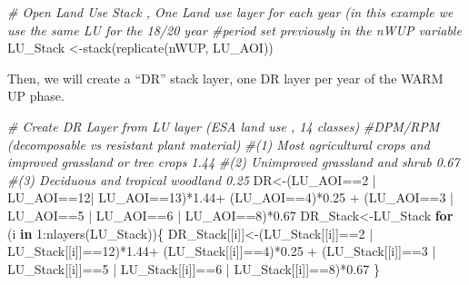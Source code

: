 \documentclass[
  10pt,
  b5paper,
]{book}
\newenvironment{Shaded}{\begin{snugshade}}{\end{snugshade}}
\newcommand{\CommentTok}[1]{\textcolor[rgb]{0.56,0.35,0.01}{\textit{#1}}}
\newcommand{\ControlFlowTok}[1]{\textcolor[rgb]{0.13,0.29,0.53}{\textbf{#1}}}
\newcommand{\DecValTok}[1]{\textcolor[rgb]{0.00,0.00,0.81}{#1}}
\newcommand{\FloatTok}[1]{\textcolor[rgb]{0.00,0.00,0.81}{#1}}
\newcommand{\FunctionTok}[1]{\textcolor[rgb]{0.00,0.00,0.00}{#1}}
\newcommand{\NormalTok}[1]{#1}
\newcommand{\OtherTok}[1]{\textcolor[rgb]{0.56,0.35,0.01}{#1}}
\newcommand{\SpecialCharTok}[1]{\textcolor[rgb]{0.00,0.00,0.00}{#1}}
\begin{document}
\begin{Shaded}
\begin{Highlighting}[]
\CommentTok{\# Open Land Use Stack , One Land use layer for each year (in this example we use the same LU for the 18/20 year \#period set previously in the nWUP variable}
\NormalTok{ LU\_Stack }\OtherTok{\textless{}{-}}\FunctionTok{stack}\NormalTok{(}\FunctionTok{replicate}\NormalTok{(nWUP, LU\_AOI))}
\end{Highlighting}
\end{Shaded}

Then, we will create a ``DR'' stack layer, one DR layer per year of the WARM UP phase.

\begin{Shaded}
\begin{Highlighting}[]
\CommentTok{\# Create DR Layer from LU layer (ESA land use , 14 classes)}
\CommentTok{\#DPM/RPM (decomposable vs resistant plant material)}
\CommentTok{\#(1) Most agricultural crops and improved grassland or tree crops 1.44 }
\CommentTok{\#(2) Unimproved grassland and shrub 0.67}
\CommentTok{\#(3) Deciduous and tropical woodland 0.25    }
\NormalTok{DR}\OtherTok{\textless{}{-}}\NormalTok{(LU\_AOI}\SpecialCharTok{==}\DecValTok{2} \SpecialCharTok{|}\NormalTok{ LU\_AOI}\SpecialCharTok{==}\DecValTok{12}\SpecialCharTok{|}\NormalTok{ LU\_AOI}\SpecialCharTok{==}\DecValTok{13}\NormalTok{)}\SpecialCharTok{*}\FloatTok{1.44}\SpecialCharTok{+}\NormalTok{ (LU\_AOI}\SpecialCharTok{==}\DecValTok{4}\NormalTok{)}\SpecialCharTok{*}\FloatTok{0.25} \SpecialCharTok{+}\NormalTok{ (LU\_AOI}\SpecialCharTok{==}\DecValTok{3} \SpecialCharTok{|}\NormalTok{ LU\_AOI}\SpecialCharTok{==}\DecValTok{5} \SpecialCharTok{|}\NormalTok{ LU\_AOI}\SpecialCharTok{==}\DecValTok{6} \SpecialCharTok{|}\NormalTok{ LU\_AOI}\SpecialCharTok{==}\DecValTok{8}\NormalTok{)}\SpecialCharTok{*}\FloatTok{0.67}
\NormalTok{DR\_Stack}\OtherTok{\textless{}{-}}\NormalTok{LU\_Stack}
\ControlFlowTok{for}\NormalTok{ (i }\ControlFlowTok{in} \DecValTok{1}\SpecialCharTok{:}\FunctionTok{nlayers}\NormalTok{(LU\_Stack))\{}
\NormalTok{DR\_Stack[[i]]}\OtherTok{\textless{}{-}}\NormalTok{(LU\_Stack[[i]]}\SpecialCharTok{==}\DecValTok{2} \SpecialCharTok{|}\NormalTok{ LU\_Stack[[i]]}\SpecialCharTok{==}\DecValTok{12}\NormalTok{)}\SpecialCharTok{*}\FloatTok{1.44}\SpecialCharTok{+}\NormalTok{ (LU\_Stack[[i]]}\SpecialCharTok{==}\DecValTok{4}\NormalTok{)}\SpecialCharTok{*}\FloatTok{0.25} \SpecialCharTok{+}\NormalTok{ (LU\_Stack[[i]]}\SpecialCharTok{==}\DecValTok{3} \SpecialCharTok{|}\NormalTok{ LU\_Stack[[i]]}\SpecialCharTok{==}\DecValTok{5} \SpecialCharTok{|}\NormalTok{ LU\_Stack[[i]]}\SpecialCharTok{==}\DecValTok{6} \SpecialCharTok{|}\NormalTok{ LU\_Stack[[i]]}\SpecialCharTok{==}\DecValTok{8}\NormalTok{)}\SpecialCharTok{*}\FloatTok{0.67}
\NormalTok{\}}
\end{Highlighting}
\end{Shaded}
\end{document}
